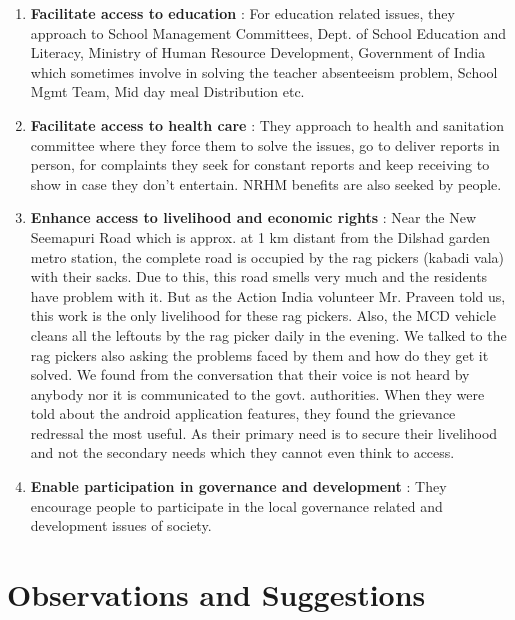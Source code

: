\begin{enumerate}
\begin{enumerate}
 \item \textbf{Facilitate access to education} : For education related issues, they approach to School Management Committees, Dept. of School Education and Literacy, Ministry of Human Resource Development, Government of India which sometimes involve in solving the teacher absenteeism problem, School Mgmt Team, Mid day meal Distribution etc.
 
 \item \textbf{Facilitate access to health care} : They approach to health and sanitation committee where they force them to solve
the issues, go to deliver reports in person, for complaints they seek for constant reports and keep receiving to show in case they don’t entertain. NRHM benefits are also seeked by people.

 \item   \textbf {Enhance access to livelihood and economic rights} : Near the New Seemapuri Road which is approx. at 1 km distant from the Dilshad garden metro station, the complete road is occupied by the rag pickers (kabadi vala)
with their sacks. Due to this, this road smells very much and the residents have
problem with it. But as the Action India volunteer Mr. Praveen told us, this work is
the only livelihood for these rag pickers. Also, the MCD vehicle cleans all the
leftouts by the rag picker daily in the evening. We talked to the rag pickers also
asking the problems faced by them and how do they get it solved. We found from the
conversation that their voice is not heard by anybody nor it is communicated to the
govt. authorities.
When they were told about the android application features, they found the
grievance redressal the most useful. As their primary need is to secure their
livelihood and not the secondary needs which they cannot even think to access.
 \item  \textbf{ Enable participation in governance and development} : They encourage people to participate in the local governance related and development issues of society.
\end{enumerate}

\end{enumerate}




\section {Observations and Suggestions}

